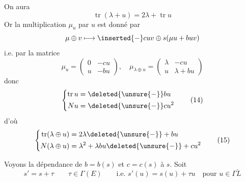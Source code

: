  On aura
\[
\operatorname{tr}(\lambda+u)=2\lambda+\operatorname{tr}u
\]
Or la multiplication $\mu_u$ par $u$ est donné par
\[
\mu\oplus v\longmapsto\inserted{-}cuv\oplus s(\mu u+buv)
\]
i.e. par la matrice
\[
\mu_u=\begin{pmatrix}0&-cu\\u&-bu\end{pmatrix},\quad
\mu_{\lambda\oplus u}=\begin{pmatrix}\lambda&-cu\\u&\lambda+bu\end{pmatrix}
\]
donc
\[
\left\{\begin{aligned}
\operatorname{tr}u&=\deleted{\unsure{-}}bu\\
Nu&=\deleted{\unsure{-}}cu^2
\end{aligned}\right. \tag*{(14)}
\]
d'où
\[
\left\{\begin{aligned}
\operatorname{tr}(\lambda\oplus u)&=2\lambda\deleted{\unsure{-}}+bu\\
N(\lambda\oplus u)&=\lambda^2+\lambda bu\deleted{\unsure{-}}+cu^2
\end{aligned}\right. \tag*{(15)}
\]

Voyons la dépendance de $b=b(s)$ et $c=c(s)$  à $s$. Soit 
\[
s'=s+\tau\qquad \tau\in\Gamma(E)\qquad\text{i.e. }s'(u)=s(u)+\tau u
\quad\text{pour }u\in\Gamma\check L \tag*{(16)}
\]



